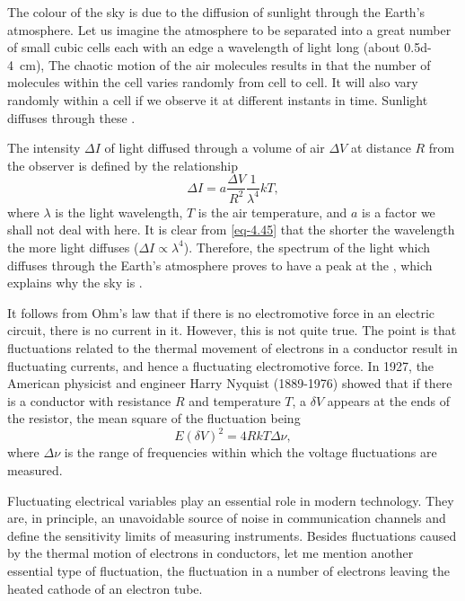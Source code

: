  The colour of the sky is due to the diffusion of sunlight through the Earth's atmosphere. Let us imagine the atmosphere to be separated into a great number of small cubic cells each with an edge a wavelength of light long (about \SI{0.5d-4}{\centi\meter}), The chaotic motion of the air molecules results in that the number of molecules within the cell varies randomly from cell to cell. It will also vary randomly within a cell if we observe it at different instants in time. Sunlight diffuses through these .

The intensity $\Delta I$ of light diffused through a volume of air $\Delta V$ at distance $R$ from the observer is defined by the relationship
\begin{equation}%
\Delta I = a \frac{\Delta V}{R^{2}} \frac{1}{\lambda^{4}} kT,
\label{eq-4.45}
\end{equation}
where $\lambda$ is the light wavelength, $T$ is the air temperature, and $a$ is a factor we shall not deal with here. It is clear from \eqref{eq-4.45} that the shorter the wavelength the more light diffuses ($\Delta I \propto \lambda^{4}
$). Therefore, the spectrum of the light which diffuses through the Earth's atmosphere proves to have a peak at the , which explains why the sky is .

 It follows from Ohm's law that if there is no electromotive force in an electric circuit, there is no current in it. However, this is not quite true. The point is that fluctuations related to the thermal movement of electrons in a conductor result in fluctuating currents, and hence a fluctuating electromotive force. In 1927, the American physicist and engineer Harry Nyquist (1889-1976) showed that if there is a conductor with resistance $R$ and temperature $T$, a  $\delta V$ appears at the ends of the resistor, the mean square of the fluctuation being
\begin{equation}%
E(\delta V)^{2} = 4 R k T \Delta \nu,
\label{eq-4.46}
\end{equation}
where $\Delta \nu $ is the range of frequencies within which the voltage fluctuations are measured.

Fluctuating electrical variables play an essential role in modern technology. They are, in principle, an unavoidable source of noise in communication channels and define the sensitivity limits of measuring instruments. Besides fluctuations caused by the thermal motion of electrons in conductors, let me mention another essential type of fluctuation, the fluctuation in a number of electrons leaving the heated cathode of an electron tube.

